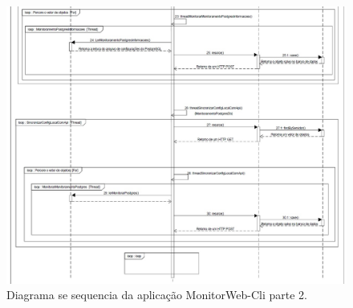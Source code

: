 \begin{figure}[H]
	\centering
	\includegraphics[width=1.0\textwidth]{figuras/diagramaSequencia2.jpg}
	\caption[Diagrama se sequencia da aplicação MonitorWeb-Cli parte 2.]{Diagrama se sequencia da aplicação MonitorWeb-Cli parte 2.}
	\label{Img:MonitorWeb-Cli-DiagramaDeSequencia2}
\end{figure}


